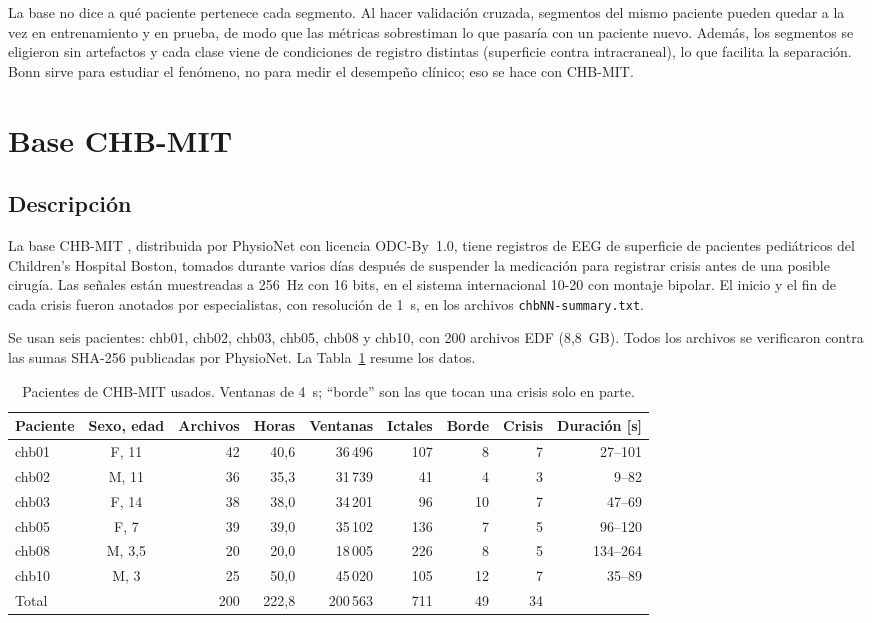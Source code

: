 La base no dice a qué paciente pertenece cada segmento. Al hacer validación cruzada, segmentos del mismo
paciente pueden quedar a la vez en entrenamiento y en prueba, de modo que las métricas sobrestiman lo que
pasaría con un paciente nuevo. Además, los segmentos se eligieron sin artefactos y cada clase viene de
condiciones de registro distintas (superficie contra intracraneal), lo que facilita la separación. Bonn sirve
para estudiar el fenómeno, no para medir el desempeño clínico; eso se hace con CHB-MIT.

\section{Base CHB-MIT}
\label{sec:chbmit}

\subsection{Descripción}

La base CHB-MIT \parencite{shoeb2009,guttag2010}, distribuida por PhysioNet \parencite{goldberger2000} con
licencia ODC-By~1.0, tiene registros de EEG de superficie de pacientes pediátricos del Children's Hospital
Boston, tomados durante varios días después de suspender la medicación para registrar crisis antes de una
posible cirugía. Las señales están muestreadas a 256~Hz con 16 bits, en el sistema internacional 10-20 con
montaje bipolar. El inicio y el fin de cada crisis fueron anotados por especialistas, con resolución de
1~s, en los archivos \texttt{chbNN-summary.txt}.

Se usan seis pacientes: chb01, chb02, chb03, chb05, chb08 y chb10, con 200 archivos EDF (8,8~GB). Todos
los archivos se verificaron contra las sumas SHA-256 publicadas por PhysioNet. La Tabla~\ref{tab:pacientes}
resume los datos.

\begin{table}[ht]
\centering
\caption{Pacientes de CHB-MIT usados. Ventanas de 4~s; ``borde'' son las que tocan una crisis solo en parte.}
\label{tab:pacientes}
\begin{tabular}{lcrrrrrrr}
\toprule
Paciente & Sexo, edad & Archivos & Horas & Ventanas & Ictales & Borde & Crisis & Duración [s] \\
\midrule
chb01 & F, 11  & 42 & 40,6 & 36\,496 & 107 & 8  & 7 & 27--101 \\
chb02 & M, 11  & 36 & 35,3 & 31\,739 & 41  & 4  & 3 & 9--82 \\
chb03 & F, 14  & 38 & 38,0 & 34\,201 & 96  & 10 & 7 & 47--69 \\
chb05 & F, 7   & 39 & 39,0 & 35\,102 & 136 & 7  & 5 & 96--120 \\
chb08 & M, 3,5 & 20 & 20,0 & 18\,005 & 226 & 8  & 5 & 134--264 \\
chb10 & M, 3   & 25 & 50,0 & 45\,020 & 105 & 12 & 7 & 35--89 \\
\midrule
Total &        & 200 & 222,8 & 200\,563 & 711 & 49 & 34 & \\
\bottomrule
\end{tabular}
\end{table}

